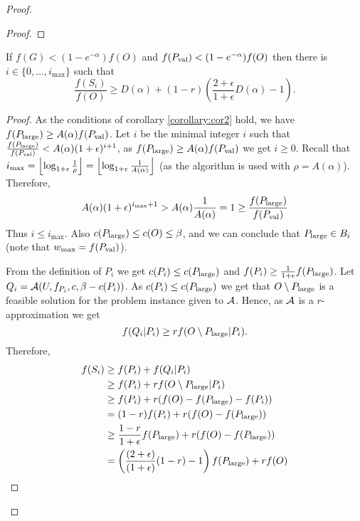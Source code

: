 \documentclass[a4paper]{article}
\begin{document}
\begin{proof}
\begin{proof}
			
		\end{proof}

	\begin{corollary}
		\label{corollary:cor3}
			If $f(G)< (1-e^{-\alpha})f(O)$ and $f(P_{\text{val}}) < (1-e^{-\alpha})f(O)$ then
			there is $i\in \{0, \ldots, i_{\max}\}$ such that
		$$\frac{f(S_i)}{f(O)} \geq D(\alpha) + (1-r)\left( \frac{2+\epsilon}{1+\epsilon} D(\alpha) -1 \right).$$
	\end{corollary}
\begin{proof}
		As the conditions of corollary \ref{corollary:cor2} hold, we have
		$f(P_{\text{large}}) \geq A(\alpha) f(P_{\text{val}})$.
		 Let $i$ be the minimal integer $i$ such
		that $\frac{f(P_{\text{large}})}{f(P_{\text{val}})} < A(\alpha)(1+\epsilon) ^{i+1}$, as $f(P_{\text{large}}) \geq A(\alpha) f(P_{\text{val}})$ we get $i\geq 0$.
		Recall that $i_{\max}= \left\lfloor \log_{1+\epsilon} \frac{1}{\rho}  \right\rfloor =
		\left\lfloor \log_{1+\epsilon} \frac{1}{A(\alpha)} \right\rfloor $ (as the algorithm is used
			with $\rho=A(\alpha)$).
			Therefore,
			$$A(\alpha) (1+\epsilon) ^{i_{\max} +1}
			> A(\alpha) \frac{1}{A(\alpha) } = 1 \geq \frac{f(P_{\text{large}})}{f(P_{\text{val}})}$$
			Thus $i\leq i_{\max}$.
			Also $c(P_{\text{large}}) \leq c(O) \leq \beta$, and we can conclude that
			$P_{\text{large}} \in B_i$ (note that $w_{\max} = f(P_{\text{val}})$).
			
			From the definition of $P_i$ we get $c(P_i)\leq c(P_{\text{large}})$ and
			$f(P_i) \geq \frac{1}{1+\epsilon} f(P_{\text{large}})$.
			Let $Q_i  =  \mathcal{A}(U, f_{P_i}, c, \beta - c(P_i))$.
			As $c(P_i) \leq c(P_{\text{large}})$ we get that $O\setminus P_{\text{large}}$
			is a feasible solution for the problem instance given to $\mathcal{A}$.
			Hence, as $\mathcal{A}$ is a $r$-approximation we get
			$$f(Q_i | P_i) \geq r f(O\setminus P_{\text{large}}| P_i).$$
			Therefore,
			\begin{align*}
			f(S_{i})
			&
			\geq f(P_i) + f(Q_i|P_i)
			\\ &
			\geq f(P_i) + r f(O \setminus P_{\text{large}} | P_i)
			\\ &
			\geq f(P_i) + r(f(O) - f(P_{\text{large}}) - f(P_i))
			\\ &
			= (1-r)f(P_i) + r(f(O) - f(P_{\text{large}}))
			\\ &
			\geq \frac{1-r}{1 + \epsilon}f(P_{\text{large}}) + r(f(O) - f(P_{\text{large}}))
			\\ &
			= \left(
			\frac{(2 + \epsilon)}{(1 + \epsilon)}(1-r) - 1
			\right)
			f(P_{\text{large}})
			+ rf(O)
			\end{align*}
			

\end{proof}
\end{proof}
\end{document}
